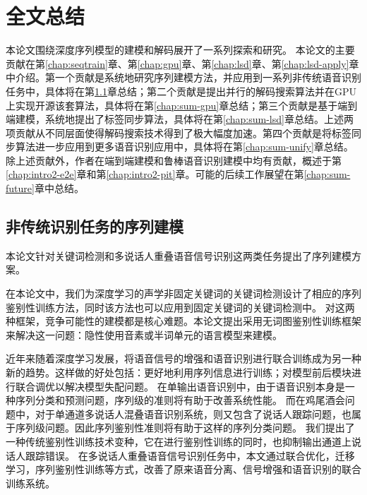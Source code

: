 
\chapter{全文总结}
\label{chap:sum}

本论文围绕深度序列模型的建模和解码展开了一系列探索和研究。
本论文的主要贡献在第\ref{chap:seqtrain}章、第\ref{chap:gpu}章、第\ref{chap:lsd}章、第\ref{chap:lsd-apply}章中介绍。第一个贡献是系统地研究序列建模方法，并应用到一系列非传统语音识别任务中，具体将在第\ref{chap:sum-kws}章总结；第二个贡献是提出并行的解码搜索算法并在GPU上实现开源该套算法，具体将在第\ref{chap:sum-gpu}章总结；第三个贡献是基于端到端建模，系统地提出了标签同步算法，具体将在第\ref{chap:sum-lsd}章总结。上述两项贡献从不同层面使得解码搜索技术得到了极大幅度加速。第四个贡献是将标签同步算法进一步应用到更多语音识别应用中，具体将在第\ref{chap:sum-unify}章总结。
除上述贡献外，作者在端到端建模和鲁棒语音识别建模中均有贡献，概述于第\ref{chap:intro2-e2e}章和第\ref{chap:intro2-pit}章。可能的后续工作展望在第\ref{chap:sum-future}章中总结。


\section{非传统识别任务的序列建模}
\label{chap:sum-kws}

本论文针对关键词检测和多说话人重叠语音信号识别这两类任务提出了序列建模方案。

在本论文中，我们为深度学习的声学非固定关键词的关键词检测设计了相应的序列鉴别性训练方法，同时该方法也可以应用到固定关键词的关键词检测中。
%
对这两种框架，竞争可能性的建模都是核心难题。本论文提出采用无词图鉴别性训练框架来解决这一问题：隐性使用音素或半词单元的语言模型来建模。


近年来随着深度学习发展，将语音信号的增强和语音识别进行联合训练成为另一种新的趋势。这样做的好处包括：更好地利用序列信息进行训练；对模型前后模块进行联合调优以解决模型失配问题。
%
在单输出语音识别中，由于语音识别本身是一种序列分类和预测问题，序列级的准则将有助于改善系统性能。
而在鸡尾酒会问题中，对于单通道多说话人混叠语音识别系统，则又包含了说话人跟踪问题，也属于序列级问题。因此序列鉴别性准则将有助于这样的序列分类问题。
我们提出了一种传统鉴别性训练技术变种，它在进行鉴别性训练的同时，也抑制输出通道上说话人跟踪错误。
在多说话人重叠语音信号识别任务中，本文通过联合优化，迁移学习，序列鉴别性训练等方式，改善了原来语音分离、信号增强和语音识别的联合训练系统。


